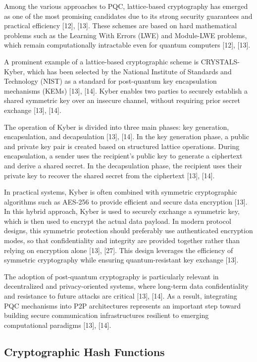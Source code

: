 \documentclass[12pt]{article}
\begin{document}
Among the various approaches to PQC, lattice-based cryptography has emerged as one of the most promising candidates due to its strong security guarantees and practical efficiency [12], [13]. These schemes are based on hard mathematical problems such as the Learning With Errors (LWE) and Module-LWE problems, which remain computationally intractable even for quantum computers [12], [13].

A prominent example of a lattice-based cryptographic scheme is CRYSTALS-Kyber, which has been selected by the National Institute of Standards and Technology (NIST) as a standard for post-quantum key encapsulation mechanisms (KEMs) [13], [14]. Kyber enables two parties to securely establish a shared symmetric key over an insecure channel, without requiring prior secret exchange [13], [14].

The operation of Kyber is divided into three main phases: key generation, encapsulation, and decapsulation [13], [14]. In the key generation phase, a public and private key pair is created based on structured lattice operations. During encapsulation, a sender uses the recipient's public key to generate a ciphertext and derive a shared secret. In the decapsulation phase, the recipient uses their private key to recover the shared secret from the ciphertext [13], [14].

In practical systems, Kyber is often combined with symmetric cryptographic algorithms such as AES-256 to provide efficient and secure data encryption [13]. In this hybrid approach, Kyber is used to securely exchange a symmetric key, which is then used to encrypt the actual data payload. In modern protocol designs, this symmetric protection should preferably use authenticated encryption modes, so that confidentiality and integrity are provided together rather than relying on encryption alone [13], [27]. This design leverages the efficiency of symmetric cryptography while ensuring quantum-resistant key exchange [13].

The adoption of post-quantum cryptography is particularly relevant in decentralized and privacy-oriented systems, where long-term data confidentiality and resistance to future attacks are critical [13], [14]. As a result, integrating PQC mechanisms into P2P architectures represents an important step toward building secure communication infrastructures resilient to emerging computational paradigms [13], [14].


\subsection{Cryptographic Hash Functions}
\end{document}
